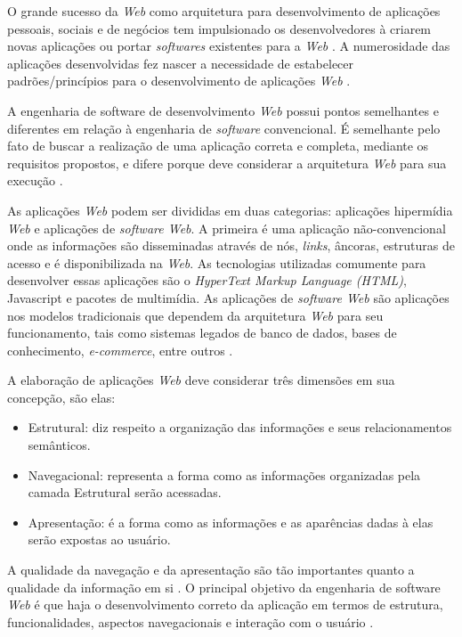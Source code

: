 O grande sucesso da \textit{Web} como arquitetura para desenvolvimento de aplicações pessoais, sociais e de negócios tem impulsionado os desenvolvedores à criarem novas aplicações ou portar \textit{softwares} existentes para a \textit{Web} \cite{fraternali1998conceptual}. A numerosidade das aplicações desenvolvidas fez nascer a necessidade de estabelecer padrões/princípios para o desenvolvimento de aplicações \textit{Web} \cite{pressman2000tangled}.
   
A engenharia de software de desenvolvimento \textit{Web} possui pontos semelhantes e diferentes em relação à engenharia de \textit{software} convencional. É semelhante pelo fato de buscar a realização de uma aplicação correta e completa, mediante os requisitos propostos, e difere porque deve considerar a arquitetura \textit{Web} para sua execução \cite{conte2005processos}.

As aplicações \textit{Web} podem ser divididas em duas categorias: aplicações hipermídia \textit{Web} e aplicações de \textit{software Web}. A primeira é uma aplicação não-convencional onde as informações são disseminadas através de nós, \textit{links}, âncoras, estruturas de acesso e é disponibilizada na \textit{Web}. As tecnologias utilizadas comumente para desenvolver essas aplicações são o \textit{HyperText Markup Language (HTML)}, Javascript e pacotes de multimídia. As aplicações de \textit{software Web} são aplicações nos modelos tradicionais que dependem da arquitetura \textit{Web} para seu funcionamento, tais como sistemas legados de banco de dados, bases de conhecimento, \textit{e-commerce}, entre outros \cite{mendes2005investigating}.

A elaboração de aplicações \textit{Web} deve considerar três dimensões em sua concepção, são elas:

\begin{itemize}
	\item Estrutural: diz respeito a organização das informações e seus relacionamentos semânticos.
	\item Navegacional: representa a forma como as informações organizadas pela camada Estrutural serão acessadas.
	\item Apresentação: é a forma como as informações e as aparências dadas à elas serão expostas ao usuário.
\end{itemize}

A qualidade da navegação e da apresentação são tão importantes quanto a qualidade da informação em si \cite{fraternali1998conceptual}. O principal objetivo da engenharia de software \textit{Web} é que haja o desenvolvimento correto da aplicação em termos de estrutura, funcionalidades, aspectos navegacionais e interação com o usuário \cite{pastor2004fitting}.

